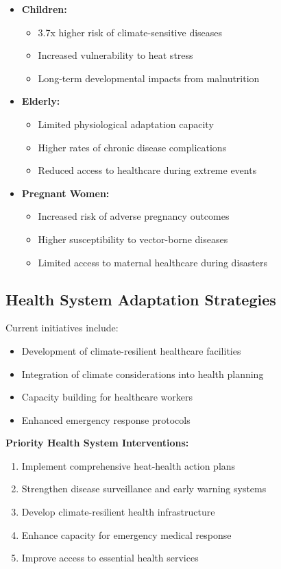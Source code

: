 \begin{itemize}
    \item \textbf{Children:}
    \begin{itemize}
        \item 3.7x higher risk of climate-sensitive diseases
        \item Increased vulnerability to heat stress
        \item Long-term developmental impacts from malnutrition
    \end{itemize}
    
    \item \textbf{Elderly:}
    \begin{itemize}
        \item Limited physiological adaptation capacity
        \item Higher rates of chronic disease complications
        \item Reduced access to healthcare during extreme events
    \end{itemize}
    
    \item \textbf{Pregnant Women:}
    \begin{itemize}
        \item Increased risk of adverse pregnancy outcomes
        \item Higher susceptibility to vector-borne diseases
        \item Limited access to maternal healthcare during disasters
    \end{itemize}
\end{itemize}

\subsection{Health System Adaptation Strategies}
Current initiatives include:

\begin{itemize}
    \item Development of climate-resilient healthcare facilities
    \item Integration of climate considerations into health planning
    \item Capacity building for healthcare workers
    \item Enhanced emergency response protocols
\end{itemize}

\begin{recommendation}
\textbf{Priority Health System Interventions:}
\begin{enumerate}
    \item Implement comprehensive heat-health action plans
    \item Strengthen disease surveillance and early warning systems
    \item Develop climate-resilient health infrastructure
    \item Enhance capacity for emergency medical response
    \item Improve access to essential health services
\end{enumerate}
\end{recommendation}
